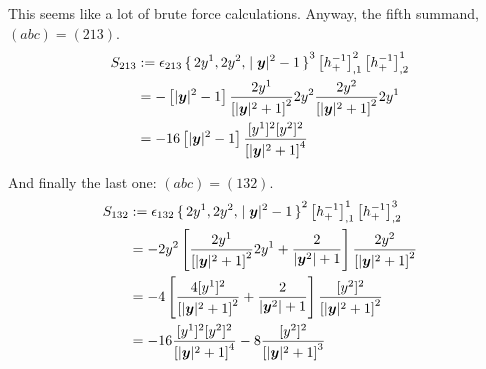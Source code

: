 \documentclass[11pt, english, fleqn, DIV=15, headinclude, BCOR=1cm]{scrartcl}
\begin{document}
This seems like a lot of brute force calculations. Anyway, the fifth summand,
$(abc) = (213)$.
\begin{align*}
    S_{213}
    &:= \epsilon_{213} \set{2 y^1, 2y^2, |\boldsymbol{y}|^2 -1}^3
    \left[ h_+^{-1} \right]^{2}_{,1}
    \left[ h_+^{-1} \right]^{1}_{,2} \\
    &= - \left[ |\boldsymbol{y}|^2 -1 \right]
    \frac{2 y^1}{\left[ |\boldsymbol{y}|^2 + 1 \right]^2} 2y^2
    \frac{2 y^2}{\left[ |\boldsymbol{y}|^2 + 1 \right]^2} 2y^1 \\
    &= - 16 \left[ |\boldsymbol{y}|^2 -1 \right]
    \frac{[y^1]^2 [y^2]^2}{\left[ |\boldsymbol{y}|^2 + 1 \right]^4}
\end{align*}

And finally the last one: $(abc) = (132)$.
\begin{align*}
    S_{132}
    &:= \epsilon_{132} \set{2 y^1, 2y^2, |\boldsymbol{y}|^2 -1}^2
    \left[ h_+^{-1} \right]^{1}_{,1}
    \left[ h_+^{-1} \right]^{3}_{,2} \\
    &= - 2y^2
    \left[ \frac{2y^1}{\left[ |\boldsymbol{y}|^2 + 1 \right]^2} 2y^1 + \frac{2}{|\boldsymbol{y}^2| + 1} \right]
    \frac{2y^2}{\left[ |\boldsymbol{y}|^2 + 1 \right]^2} \\
    &= - 4
    \left[ \frac{4 [y^1]^2}{\left[ |\boldsymbol{y}|^2 + 1 \right]^2} + \frac{2}{|\boldsymbol{y}^2| + 1} \right]
    \frac{[y^2]^2}{\left[ |\boldsymbol{y}|^2 + 1 \right]^2} \\
    &= - 16
    \frac{[y^1]^2 [y^2]^2}{\left[ |\boldsymbol{y}|^2 + 1 \right]^4}
    - 8
    \frac{[y^2]^2}{\left[ |\boldsymbol{y}|^2 + 1 \right]^3}
\end{align*}
\end{document}
